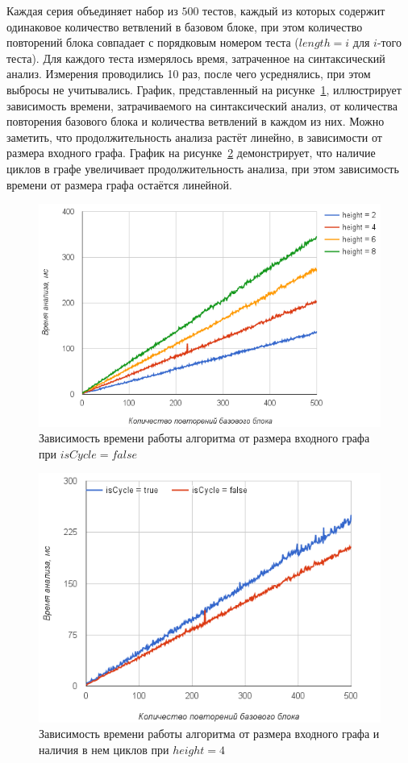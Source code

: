 Каждая серия объединяет набор из $500$ тестов, каждый из которых содержит одинаковое количество ветвлений в базовом блоке, при этом количество повторений блока совпадает с порядковым номером теста ($length=i$ для $i$-того теста). Для каждого теста измерялось время, затраченное на синтаксический анализ. Измерения проводились 10 раз, после чего усреднялись, при этом выбросы не учитывались. График, представленный на рисунке~\ref{diffheights}, иллюстрирует зависимость времени, затрачиваемого на синтаксический анализ, от количества повторения базового блока и количества ветвлений в каждом из них. Можно заметить, что продолжительность анализа растёт линейно, в зависимости от размера входного графа. График на рисунке~\ref{CycleVsLinear} демонстрирует, что наличие циклов в графе увеличивает продолжительность анализа, при этом зависимость времени от размера графа остаётся линейной. 
\begin{figure}[h!]
 \centering
 \includegraphics[width=15cm]{pics/diffheights.png}
 \caption{Зависимость времени работы алгоритма от размера входного графа при $isCycle=false$}
 \label{diffheights}
\end{figure}
\begin{figure}[h!]
 \centering
 \includegraphics[width=15cm]{pics/heigh4.png}
 \caption{Зависимость времени работы алгоритма от размера входного графа и наличия в нем циклов при $height=4$}
 \label{CycleVsLinear}
\end{figure}

